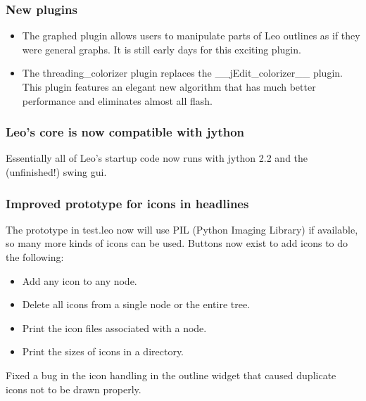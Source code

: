 \documentclass[a4paper,10pt,english]{sphinxmanual}
\begin{document}
\subsubsection{New plugins}
\label{what-is-new:id17}\begin{itemize}
\item {} 
The graphed plugin allows users to manipulate parts of Leo outlines as if they
were general graphs. It is still early days for this exciting plugin.

\item {} 
The threading\_colorizer plugin replaces the \_\_jEdit\_colorizer\_\_ plugin. This
plugin features an elegant new algorithm that has much better performance and
eliminates almost all flash.

\end{itemize}


\subsubsection{Leo's core is now compatible with jython}
\label{what-is-new:leo-s-core-is-now-compatible-with-jython}
Essentially all of Leo's startup code now runs with jython 2.2 and the (unfinished!) swing gui.


\subsubsection{Improved prototype for icons in headlines}
\label{what-is-new:improved-prototype-for-icons-in-headlines}
The prototype in test.leo now will use PIL (Python Imaging Library) if
available, so many more kinds of icons can be used. Buttons now exist to add
icons to do the following:
\begin{itemize}
\item {} 
Add any icon to any node.

\item {} 
Delete all icons from a single node or the entire tree.

\item {} 
Print the icon files associated with a node.

\item {} 
Print the sizes of icons in a directory.

\end{itemize}

Fixed a bug in the icon handling in the outline widget that caused
duplicate icons not to be drawn properly.
\end{document}
